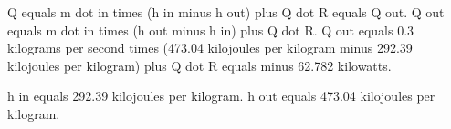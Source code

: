 Q equals m dot in times (h in minus h out) plus Q dot R equals Q out.  
Q out equals m dot in times (h out minus h in) plus Q dot R.  
Q out equals 0.3 kilograms per second times (473.04 kilojoules per kilogram minus 292.39 kilojoules per kilogram) plus Q dot R equals minus 62.782 kilowatts.  

h in equals 292.39 kilojoules per kilogram.  
h out equals 473.04 kilojoules per kilogram.